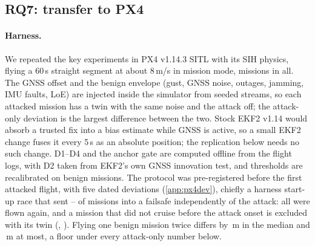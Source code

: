 \subsection{RQ7: transfer to PX4}
\label{sec:px4}
\paragraph{Harness.}
We repeated the key experiments in PX4 v1.14.3 SITL with its SIH physics, flying
a 60\,s straight segment at about 8\,m/s in mission mode, \nPxMissions{} missions in all.
The GNSS offset and the benign envelope (gust, GNSS noise, outages, jamming,
IMU faults, LoE) are injected inside the simulator from seeded streams, so each
attacked mission has a twin with the same noise and the attack off; the
attack-only deviation is the largest difference between the two. Stock EKF2
v1.14 would absorb a trusted fix into a bias estimate while GNSS is active, so a
small EKF2 change fuses it every 5\,s as an absolute position; the replication
below needs no such change. D1--D4 and the anchor gate are computed offline from the
flight logs, with D2 taken from EKF2's own GNSS innovation test, and thresholds
are recalibrated on \nPxBenign{} benign missions. The protocol was pre-registered
before the first attacked flight, with five dated deviations (\cref{app:px4dev}),
chiefly a harness start-up race that sent \nPxNotFlownMin--\nPxNotFlownMax{} of
missions into a failsafe independently of the attack: all \nPxRerun{} were flown
again, and a mission that did not cruise before the attack onset is excluded with
its twin (\nPxStillExcl, \nPxStillExclPct). Flying one benign mission twice differs by
\nPxReplayMed\,m in the median and \nPxReplayMax\,m at most, a floor under every
attack-only number below.


